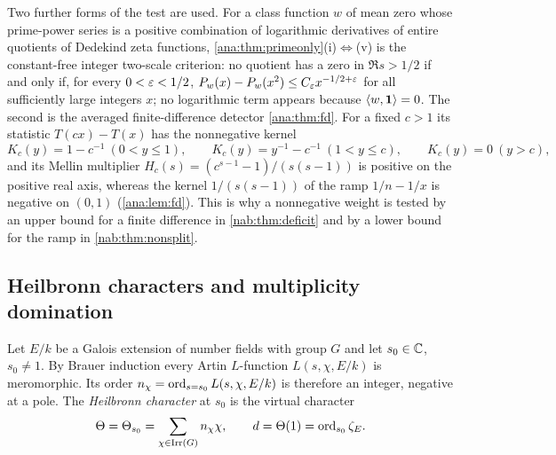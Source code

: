 Two further forms of the test are used. For a class function $w$ of mean zero whose
prime-power series is a positive combination of logarithmic derivatives of entire quotients
of Dedekind zeta functions, \cref{ana:thm:primeonly}(i)$\Leftrightarrow$(v) is the
constant-free integer two-scale criterion: no quotient has a zero in $\Re s>1/2$ if and only
if, for every $0<\varepsilon<1/2$, $P_w(x)-P_w(x^2)\le C_\varepsilon x^{-1/2+\varepsilon}$ for all sufficiently
large integers $x$; no logarithmic term appears because $\langle w,\mathbf{1}\rangle=0$. The
second is the averaged finite-difference detector \cref{ana:thm:fd}. For a fixed $c>1$ its
statistic $T(cx)-T(x)$ has the nonnegative kernel
\[
 K_c(y)=1-c^{-1}\ (0<y\le1),\qquad K_c(y)=y^{-1}-c^{-1}\ (1<y\le c),\qquad K_c(y)=0\ (y>c),
\]
and its Mellin multiplier $H_c(s)=(c^{s-1}-1)/(s(s-1))$ is positive on the positive real
axis, whereas the kernel $1/(s(s-1))$ of the ramp $1/n-1/x$ is negative on $(0,1)$
(\cref{ana:lem:fd}). This is why a nonnegative weight is tested by an upper bound for a
finite difference in \cref{nab:thm:deficit} and by a lower bound for the ramp in
\cref{nab:thm:nonsplit}.

\subsection{Heilbronn characters and multiplicity domination}\label{nab:sec:heilbronn}
\begingroup\raggedright
{}
\endgroup

Let $E/k$ be a Galois extension of number fields with group $G$ and let $s_0\in\mathbb{C}$,
$s_0\ne1$. By Brauer induction every Artin $L$-function $L(s,\chi,E/k)$ is meromorphic.
Its order $n_\chi=\operatorname{ord}_{s=s_0}L(s,\chi,E/k)$ is therefore an integer, negative at a pole. The
\emph{Heilbronn character} at $s_0$ is the virtual character
\[
 \Theta=\Theta_{s_0}=\sum_{\chi\in\operatorname{Irr}(G)}n_\chi\chi,\qquad d=\Theta(1)=\operatorname{ord}_{s_0}\zeta_E .
\]

